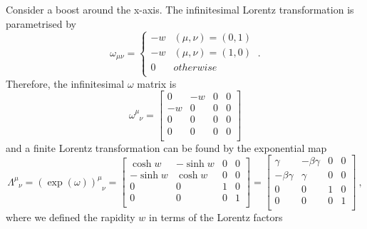     \begin{example}
        Consider a boost around the x-axis. The infinitesimal Lorentz transformation is parametrised by 
        \begin{equation*}
            \omega_{\mu\nu} = \begin{cases}
                - w & (\mu, \nu) = (0,1) \\
                - w & (\mu, \nu) = (1,0) \\
                0 & otherwise \\
            \end{cases} ~.
        \end{equation*}
        Therefore, the infinitesimal $\omega$ matrix is 
        \begin{equation*}
            \omega^\mu_{\phantom \mu \nu} = \begin{bmatrix}
                0 & - w & 0 & 0 \\
                - w & 0 & 0 & 0 \\
                0 & 0 & 0 & 0 \\
                0 & 0 & 0 & 0 \\
            \end{bmatrix}
        \end{equation*}
        and a finite Lorentz transformation can be found by the exponential map
        \begin{equation*}
            \Lambda^\mu_{\phantom \mu \nu} = (\exp(\omega))^\mu_{\phantom \mu \nu} = \begin{bmatrix}
                \cosh w & - \sinh w & 0 & 0 \\
                - \sinh w & \cosh w & 0 & 0 \\
                0 & 0 & 1 & 0 \\
                0 & 0 & 0 & 1 \\
            \end{bmatrix} = \begin{bmatrix}
                \gamma & - \beta \gamma & 0 & 0 \\
                - \beta \gamma & \gamma & 0 & 0 \\
                0 & 0 & 1 & 0 \\
                0 & 0 & 0 & 1 \\
            \end{bmatrix}~,
        \end{equation*}
        where we defined the rapidity $w$ in terms of the Lorentz factors 

\end{example}
